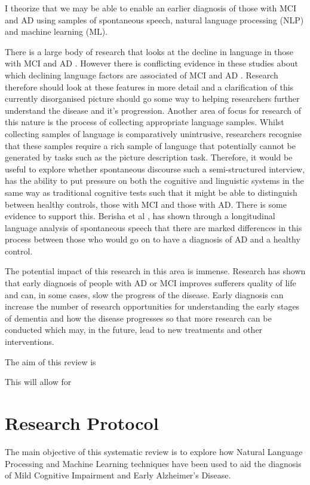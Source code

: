 \documentclass[12pt]{article}
\begin{document}
 I theorize that we may be able to enable an earlier diagnosis of those with MCI and AD using samples of spontaneous speech, natural language processing (NLP) and machine learning (ML).
\par
There is a large body of research that looks at the decline in language in those with MCI and AD \cite{Taler2008, Boschi2017}. However there is conflicting evidence in these studies about which declining language factors are associated of MCI and AD \cite{Taler2008, Boschi2017}. Research therefore should look at these features in more detail and a clarification of this currently disorganised picture should go some way to helping researchers further understand the disease and it's progression. Another area of focus for research of this nature is the process of collecting appropriate language samples. Whilst collecting samples of language is comparatively unintrusive, researchers recognise that these samples require a rich sample of language that potentially cannot be generated by tasks such as the picture description task. Therefore, it would be useful to explore whether spontaneous discourse such a semi-structured interview, has the ability to put pressure on both the cognitive and linguistic systems in the same way as traditional cognitive tests such that it might be able to distinguish between healthy controls, those with MCI and those with AD. There is some evidence to support this. Berisha et al \cite{Berisha2015}, has shown through a longitudinal language analysis of spontaneous speech that there are marked differences in this process between those who would go on to have a diagnosis of AD and a healthy control. 
\par
The potential impact of this research in this area is immense. Research has shown that early diagnosis of people with AD or MCI improves sufferers quality of life and can, in some cases, slow the progress of the disease. Early diagnosis can increase the number of research opportunities for understanding the early stages of dementia and how the disease progresses so that more research can be conducted which may, in the future, lead to new treatments and other interventions.
\par 
The aim of this review is 
\par 
This will allow for 




\section{Research Protocol}
The main objective of this systematic review is to explore how Natural Language Processing and Machine Learning techniques have been used to aid the diagnosis of Mild Cognitive Impairment and Early Alzheimer's Disease.
\end{document}
